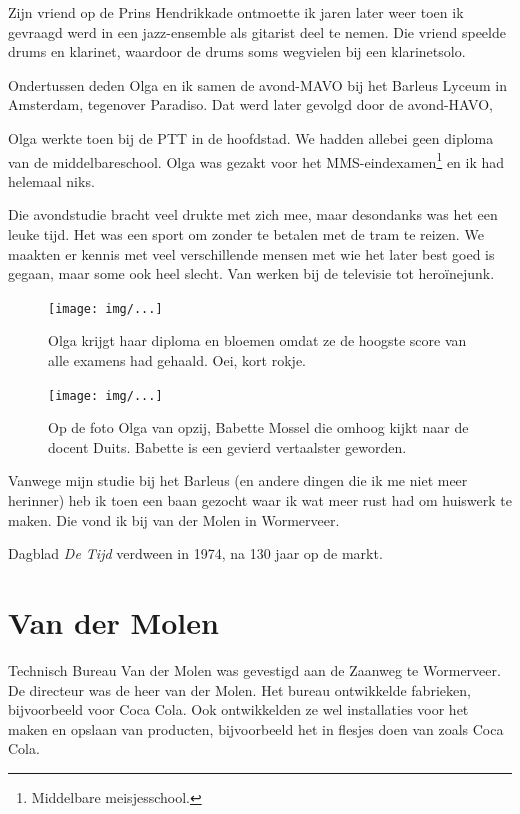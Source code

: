 \documentclass[12pt,twoside, openright]{memoir}
\begin{document}
Zijn vriend op de Prins Hendrikkade ontmoette ik jaren later weer toen ik gevraagd werd in een jazz-ensemble als gitarist deel te nemen. Die vriend speelde drums en klarinet, waardoor  de drums soms wegvielen bij een klarinetsolo.

Ondertussen deden Olga en ik samen de avond-MAVO bij het Barleus Lyceum in Amsterdam, tegenover Paradiso. Dat werd later gevolgd door de avond-HAVO,

Olga werkte toen bij de PTT in de hoofdstad. We hadden allebei geen diploma van de middelbareschool. Olga was gezakt voor het MMS-eindexamen\footnote{Middelbare meisjesschool.} en ik had helemaal niks.

Die avondstudie bracht veel drukte met zich mee, maar desondanks was het een leuke tijd. Het was een sport om zonder te betalen met de tram te reizen. We maakten er kennis met veel verschillende mensen met wie het later best goed is gegaan, maar some ook heel slecht. Van werken bij de televisie tot heroïnejunk.

\begin{figure}[t]
\texttt{[image: img/...]}
\caption{Olga krijgt haar diploma en bloemen omdat ze de hoogste score van alle examens had gehaald. Oei, kort rokje.}
\end{figure}

\begin{figure}[t]
\texttt{[image: img/...]}
\caption{Op de foto Olga van opzij, Babette Mossel die omhoog kijkt naar de docent Duits. Babette is een gevierd vertaalster geworden.}
\end{figure}

Vanwege mijn studie bij het Barleus (en andere dingen die ik me niet meer herinner) heb ik toen een baan gezocht waar ik wat meer rust had om huiswerk te maken. Die vond ik bij van der Molen in Wormerveer.

Dagblad \emph{De Tijd} verdween in 1974, na 130 jaar op de markt.

\chapter{Van der Molen} %
\label{cha:vandermolen}

Technisch Bureau Van der Molen was gevestigd aan de Zaanweg te Wormerveer. De directeur was de heer van der Molen. Het bureau ontwikkelde fabrieken, bijvoorbeeld voor Coca Cola. Ook ontwikkelden ze wel installaties voor het maken en opslaan van producten, bijvoorbeeld het in flesjes doen van zoals Coca Cola. 
\end{document}
